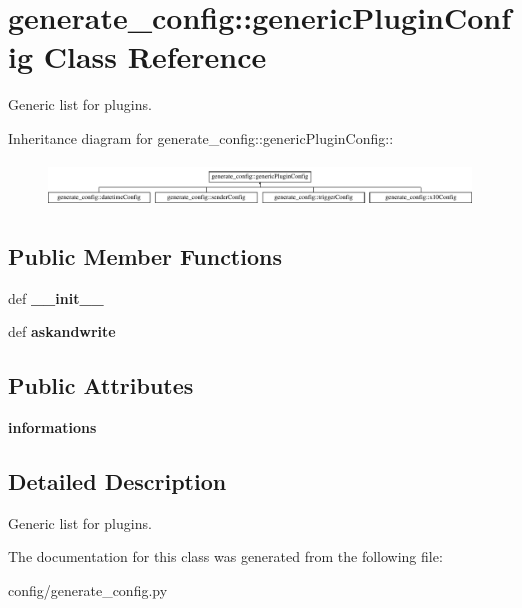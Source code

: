 \hypertarget{classgenerate__config_1_1genericPluginConfig}{
\section{generate\_\-config::genericPluginConfig Class Reference}
\label{classgenerate__config_1_1genericPluginConfig}
}
Generic list for plugins.  


Inheritance diagram for generate\_\-config::genericPluginConfig::\begin{figure}[H]
\begin{center}
\leavevmode
\includegraphics[height=1.20172cm]{classgenerate__config_1_1genericPluginConfig}
\end{center}
\end{figure}
\subsection*{Public Member Functions}
\begin{CompactItemize}
\item 
\hypertarget{classgenerate__config_1_1genericPluginConfig_6e5142c1890303123b37a9b1015601c8}{
def \textbf{\_\-\_\-init\_\-\_\-}}
\label{classgenerate__config_1_1genericPluginConfig_6e5142c1890303123b37a9b1015601c8}

\item 
\hypertarget{classgenerate__config_1_1genericPluginConfig_5e6843b1a07f91051930ac9ae93f4494}{
def \textbf{askandwrite}}
\label{classgenerate__config_1_1genericPluginConfig_5e6843b1a07f91051930ac9ae93f4494}

\end{CompactItemize}
\subsection*{Public Attributes}
\begin{CompactItemize}
\item 
\hypertarget{classgenerate__config_1_1genericPluginConfig_4d6143782994ef3d177b90f38f4512c4}{
\textbf{informations}}
\label{classgenerate__config_1_1genericPluginConfig_4d6143782994ef3d177b90f38f4512c4}

\end{CompactItemize}


\subsection{Detailed Description}
Generic list for plugins. 

The documentation for this class was generated from the following file:\begin{CompactItemize}
\item 
config/generate\_\-config.py\end{CompactItemize}
